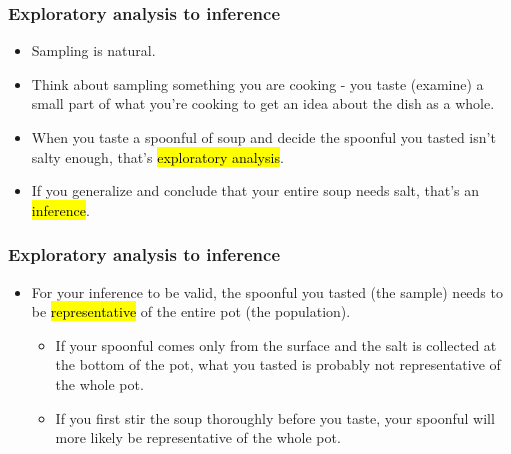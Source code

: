 \begin{frame}
\frametitle{Exploratory analysis to inference}

\begin{itemize}

\item Sampling is natural.

\pause

\item Think about sampling something you are cooking - you taste (examine) a small part of what you're cooking to get an idea about the dish as a whole.

\pause

\item When you taste a spoonful of soup and decide the spoonful you tasted isn't salty enough, that's \hl{exploratory analysis}.

\pause

\item If you generalize and conclude that your entire soup needs salt, that's an \hl{inference}.

\end{itemize}

\end{frame}


\begin{frame}
\frametitle{Exploratory analysis to inference}

\begin{itemize}

\item For your inference to be valid, the spoonful you tasted (the sample) needs to be \hl{representative} of the entire pot (the population).

\begin{itemize}
\item If your spoonful comes only from the surface and the salt is collected at the bottom of the pot, what you tasted is probably not representative of the whole pot.
\item If you first stir the soup thoroughly before you taste, your spoonful will more likely be representative of the whole pot.
\end{itemize}

\end{itemize}

\end{frame}


